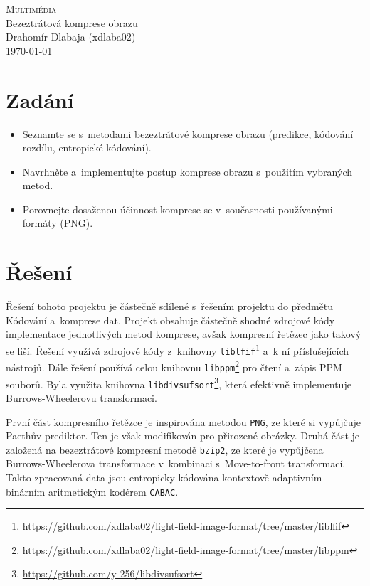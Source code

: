 \documentclass[a4paper, 11pt, titlepage]{article}
\begin{document}
	\begin{centering}
		\Large\textsc{Multimédia}\\[1em]
		\Huge{Bezeztrátová komprese obrazu}\\[1em]
		\Large{Drahomír Dlabaja (xdlaba02)}\\
		\today\\
	\end{centering}

	\section*{Zadání}

	\begin{itemize}
	 \item Seznamte se s~metodami bezeztrátové komprese obrazu (predikce, kódování rozdílu, entropické kódování).
   \item Navrhněte a~implementujte postup komprese obrazu s~použitím vybraných metod.
   \item Porovnejte dosaženou účinnost komprese se v~současnosti používanými formáty (PNG).
	\end{itemize}

	\section*{Řešení}
  Řešení tohoto projektu je částečně sdílené s~řešením projektu do předmětu Kódování a~komprese dat.
	Projekt obsahuje částečně shodné zdrojové kódy implementace jednotlivých metod komprese, avšak kompresní řetězec jako takový se liší.
	Řešení využívá zdrojové kódy z~knihovny \texttt{liblfif}\footnote{\url{https://github.com/xdlaba02/light-field-image-format/tree/master/liblfif}} a~k ní příslušejících nástrojů.
	Dále řešení používá celou knihovnu \texttt{libppm}\footnote{\url{https://github.com/xdlaba02/light-field-image-format/tree/master/libppm}} pro čtení a~zápis PPM souborů.
	Byla využita knihovna \texttt{libdivsufsort}\footnote{\url{https://github.com/y-256/libdivsufsort}}, která efektivně implementuje Burrows-Wheelerovu transformaci.

	První část kompresního řetězce je inspirována metodou \texttt{PNG}, ze které si vypůjčuje Paethův prediktor. Ten je však modifikován pro přirozené obrázky.
	Druhá část je založená na bezeztrátové kompresní metodě \texttt{bzip2}, ze které je vypůjčena Burrows-Wheelerova transformace v~kombinaci s~Move-to-front transformací.
	Takto zpracovaná data jsou entropicky kódována kontextově-adaptivním binárním aritmetickým kodérem \texttt{CABAC}.
\end{document}
